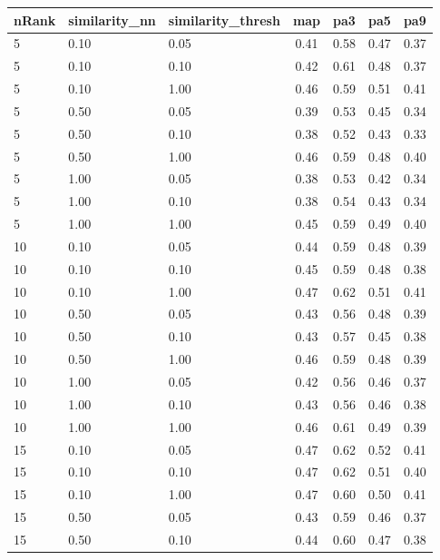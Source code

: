 \documentclass[12pt,a4paper,fleqn]{tufte-handout}
\begin{document}
 
\begin{table}           
\begin{center}           
\scriptsize           
\setlength{\tabcolsep}{.16667em}           
\begin{tabular}{lllcccc}           
nRank & similarity\_nn & similarity\_thresh & map & pa3 & pa5 & pa9 \\           
\hline           
5 & 0.10 & 0.05 & 0.41 & 0.58 & 0.47 & 0.37 \\           
5 & 0.10 & 0.10 & 0.42 & 0.61 & 0.48 & 0.37 \\           
5 & 0.10 & 1.00 & 0.46 & 0.59 & 0.51 & 0.41 \\           
5 & 0.50 & 0.05 & 0.39 & 0.53 & 0.45 & 0.34 \\           
5 & 0.50 & 0.10 & 0.38 & 0.52 & 0.43 & 0.33 \\           
5 & 0.50 & 1.00 & 0.46 & 0.59 & 0.48 & 0.40 \\           
5 & 1.00 & 0.05 & 0.38 & 0.53 & 0.42 & 0.34 \\           
5 & 1.00 & 0.10 & 0.38 & 0.54 & 0.43 & 0.34 \\           
5 & 1.00 & 1.00 & 0.45 & 0.59 & 0.49 & 0.40 \\           
10 & 0.10 & 0.05 & 0.44 & 0.59 & 0.48 & 0.39 \\           
10 & 0.10 & 0.10 & 0.45 & 0.59 & 0.48 & 0.38 \\           
10 & 0.10 & 1.00 & 0.47 & 0.62 & 0.51 & 0.41 \\           
10 & 0.50 & 0.05 & 0.43 & 0.56 & 0.48 & 0.39 \\           
10 & 0.50 & 0.10 & 0.43 & 0.57 & 0.45 & 0.38 \\           
10 & 0.50 & 1.00 & 0.46 & 0.59 & 0.48 & 0.39 \\           
10 & 1.00 & 0.05 & 0.42 & 0.56 & 0.46 & 0.37 \\           
10 & 1.00 & 0.10 & 0.43 & 0.56 & 0.46 & 0.38 \\           
10 & 1.00 & 1.00 & 0.46 & 0.61 & 0.49 & 0.39 \\           
15 & 0.10 & 0.05 & 0.47 & 0.62 & 0.52 & 0.41 \\           
15 & 0.10 & 0.10 & 0.47 & 0.62 & 0.51 & 0.40 \\           
15 & 0.10 & 1.00 & 0.47 & 0.60 & 0.50 & 0.41 \\           
15 & 0.50 & 0.05 & 0.43 & 0.59 & 0.46 & 0.37 \\           
15 & 0.50 & 0.10 & 0.44 & 0.60 & 0.47 & 0.38 \\           

\end{tabular}
\end{center}
\end{table}
\end{document}
